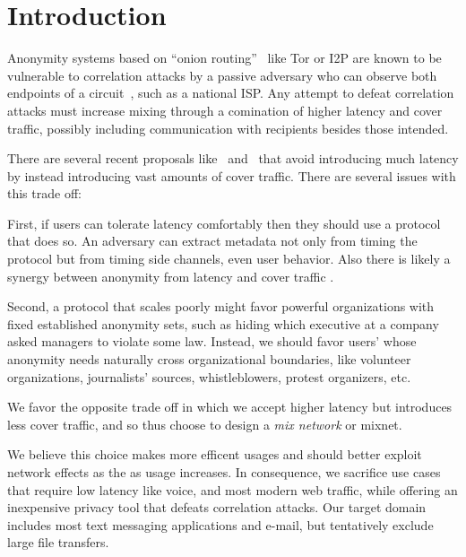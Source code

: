 
\section{Introduction}

Anonymity systems based on ``onion routing''~\cite{SS03} like Tor or
I2P are known to be vulnerable to correlation attacks by a passive
adversary who can observe both endpoints of a
circuit~\cite{timing-fc2004}, such as a national ISP.  Any attempt to
defeat correlation attacks must increase mixing through a comination
of higher latency and cover traffic, possibly including communication
with recipients besides those intended.

There are several recent proposals like~\cite{Alpenhorn}
and~\cite{Dissent} that avoid introducing much latency by instead
introducing vast amounts of cover traffic.  There are several issues
with this trade off: 


First, if users can tolerate latency comfortably then they should
use a protocol that does so.  An adversary can extract metadata not
only from timing the protocol but from timing side channels, even
user behavior.  Also there is likely a synergy between anonymity from
latency and cover traffic \cite{??}.

Second, a protocol that scales poorly might favor powerful
organizations with fixed established anonymity sets, such as hiding
which executive at a company asked managers to violate some law.
Instead, we should favor users' whose anonymity needs naturally
cross organizational boundaries, like volunteer organizations,
journalists' sources, whistleblowers, protest organizers, etc.

We favor the opposite trade off in which we accept higher latency but
introduces less cover traffic, and so thus choose to design a
{\em mix network} or mixnet.  %

We believe this choice makes more efficent usages and should better
exploit network effects as the as usage increases.  
In consequence, we sacrifice use cases that require low latency like
voice, and most modern web traffic, while offering an inexpensive
privacy tool that defeats correlation attacks.
Our target domain includes most text messaging applications and
e-mail, but tentatively exclude large file transfers. 


